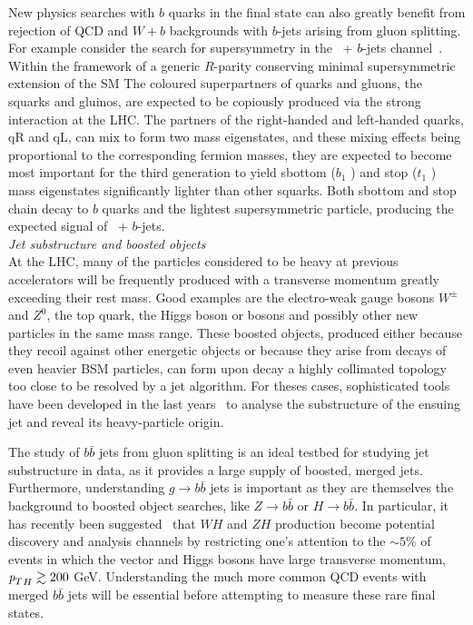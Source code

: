 New physics searches with $b$ quarks in the final state can also greatly benefit from rejection of QCD and $W+b$ backgrounds with $b$-jets arising from gluon splitting. For example consider the search for supersymmetry in the \met\ + $b$-jets channel~\cite{ATLAS-CONF-2011-098}. Within the framework of a generic $R$-parity conserving minimal supersymmetric extension of the SM The coloured superpartners of quarks and gluons, the squarks and gluinos, are expected to be copiously produced via the strong interaction at the LHC. The
partners of the right-handed and left-handed quarks, qR and qL, can mix to form two mass eigenstates, and these mixing effects being proportional to the corresponding fermion masses, they are expected to become most important for the third generation to yield sbottom ($b_1$ ) and stop ($t_1$ ) mass eigenstates significantly lighter than other squarks. Both sbottom and stop chain decay to $b$ quarks and the lightest supersymmetric particle, producing the expected signal of \met\ + $b$-jets. 
%
%
\\[5mm]
{\em Jet substructure and boosted objects}
\\[5mm]
At the LHC, many of the particles considered to be heavy at previous accelerators will be frequently produced with a transverse momentum greatly exceeding their rest mass. Good examples are the electro-weak gauge bosons $W^\pm$ and $Z^0$, the top quark, the Higgs boson or bosons and possibly other new particles in the same mass range. These boosted objects, produced either because they recoil against other energetic objects or because they arise from decays of even heavier BSM particles, can form upon decay a highly collimated topology too close to be resolved by a jet algorithm. For theses cases, sophisticated tools have been developed in the last years~\cite{boost2010,boost2010b} to analyse the substructure of the ensuing jet and reveal its heavy-particle origin. 

The study of $b\bar{b}$ jets from gluon splitting is an ideal testbed for studying jet substructure in data, as it provides a large supply of boosted, merged jets. Furthermore, understanding $g\rightarrow b \bar{b}$ jets is important as they are themselves the background to boosted object searches, like $Z\rightarrow b\bar{b}$ or $H\rightarrow b \bar{b}$.  In particular, it has recently been suggested~\cite{Butterworth:2008iy} that $WH$ and $ZH$ production become potential discovery and analysis channels by restricting one’s attention to the $\sim5$\% of events in which the vector and Higgs bosons have large transverse momentum, ${{\emph{p}_{T}}}_H\gtrsim200$ GeV. Understanding the much more common QCD events with merged $b\bar{b}$ jets will be essential before attempting to measure these rare final states.





